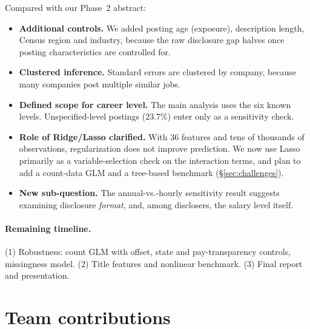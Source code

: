\documentclass{article}
\begin{document}
Compared with our Phase~2 abstract:
\begin{itemize}
  \item \textbf{Additional controls.} We added posting age (exposure), description length, Census region and industry, because the raw disclosure gap halves once posting characteristics are controlled for.
  \item \textbf{Clustered inference.} Standard errors are clustered by company, because many companies post multiple similar jobs.
  \item \textbf{Defined scope for career level.} The main analysis uses the six known levels. Unspecified-level postings (23.7\%) enter only as a sensitivity check.
  \item \textbf{Role of Ridge/Lasso clarified.} With 36 features and tens of thousands of observations, regularization does not improve prediction. We now use Lasso primarily as a variable-selection check on the interaction terms, and plan to add a count-data GLM and a tree-based benchmark (§\ref{sec:challenges}).
  \item \textbf{New sub-question.} The annual-vs.-hourly sensitivity result suggests examining disclosure \emph{format}, and, among disclosers, the salary level itself.
\end{itemize}

\paragraph{Remaining timeline.} (1) Robustness: count GLM with offset, state and pay-transparency controls, missingness model. (2) Title features and nonlinear benchmark. (3) Final report and presentation.

\section*{Team contributions}
\end{document}
